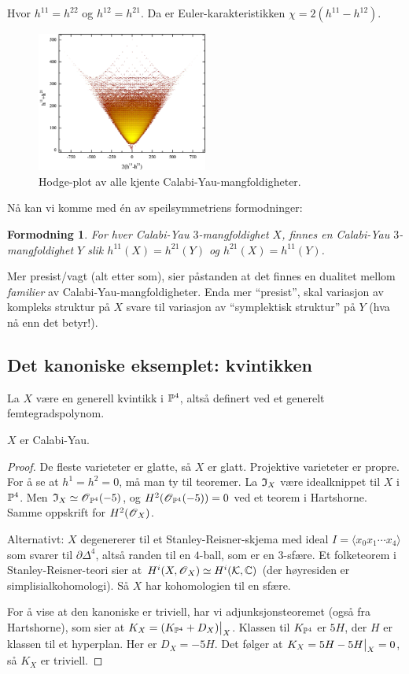 \documentclass[11pt, norsk]{article}
\newtheorem{conj}{Formodning}
\begin{document}
Hvor $h^{11}=h^{22}$ og $h^{12}=h^{21}$. Da er Euler-karakteristikken $\chi = 2(h^{11}-h^{12})$.

\begin{figure}
  \centering
    \includegraphics[width=0.5\textwidth]{hodgeplot.png}
  \caption{Hodge-plot av alle kjente Calabi-Yau-mangfoldigheter. }
\end{figure}

Nå kan vi komme  med én av speilsymmetriens formodninger:

\begin{conj}
 For hver Calabi-Yau $3$-mangfoldighet $X$, finnes en Calabi-Yau $3$-mangfoldighet $Y$ slik $h^{11}(X)=h^{21}(Y)$ og $h^{21}(X)=h^{11}(Y)$.
\end{conj}

Mer presist/vagt (alt etter som), sier påstanden at det finnes en dualitet mellom \emph{familier} av Calabi-Yau-mangfoldigheter. Enda mer ``presist'', skal variasjon av kompleks struktur på $X$ svare til variasjon av ``symplektisk struktur'' på $Y$ (hva nå enn det betyr!).

\subsection{Det kanoniske eksemplet: kvintikken}

La $X$ være en generell kvintikk i $\mathbb{P}^4$, altså definert ved et generelt femtegradspolynom.

\begin{thm}
 $X$ er Calabi-Yau.
\end{thm}
\begin{proof}
De fleste varieteter er glatte, så $X$ er glatt. Projektive varieteter er propre. For å se at $h^1=h^2=0$, må man ty til teoremer. La $\mathfrak{I}_X$ være idealknippet til $X$ i $\mathbb{P}^4$. Men $\mathfrak{I}_X \simeq \operatorname{\mathscr{O}}_{\mathbb{P}^4}(-5)$, og $H^2(\operatorname{\mathscr{O}}_{\mathbb{P}^4}(-5))=0$ ved et teorem i Hartshorne. Samme oppskrift for $H^2(\operatorname{\mathscr{O}}_X)$.

Alternativt: $X$ degenererer til et Stanley-Reisner-skjema med ideal $I=\langle x_0x_1\cdots x_4 \rangle$ som svarer til $\partial \Delta^4$, altså randen til en $4$-ball, som er en $3$-sfære. Et folketeorem i Stanley-Reisner-teori sier at $H^i(X,\operatorname{\mathscr{O}}_X) \simeq H^i(\mathcal K,\mathbb{C})$ (der høyresiden er simplisialkohomologi). Så $X$ har kohomologien til en sfære.

For å vise at den kanoniske er triviell, har vi adjunksjonsteoremet (også fra Hartshorne), som sier at $K_X = \restr{(K_{\PP^4} + D_X) }{X}$. Klassen til $K_{\mathbb{P}^4}$ er $5H$, der $H$ er klassen til et hyperplan. Her er $D_X=-5H$. Det følger at $K_X=\restr{5H-5H}{X}=0$, så $K_X$ er triviell.
\end{proof}
\end{document}
